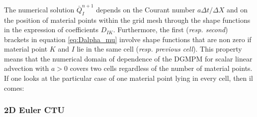 The numerical solution $\bar{Q}^{n+1}_I$ depends on the Courant number $a\Delta t / \Delta X$ and on the position of material points within the grid mesh through the shape functions in the expression of coefficients $D_{IK}$. Furthermore, the first (\textit{resp. second}) brackets in equation \eqref{eq:Dalpha_mu} involve shape functions that are non zero if material point $K$ and $I$ lie in the same cell (\textit{resp. previous cell}). This property means that the numerical domain of dependence of the DGMPM for scalar linear advection with $a>0$ covers two cells regardless of the number of material points. If one looks at the particular case of one material point lying in every cell, then il comes: 

\subsubsection*{2D Euler CTU}

